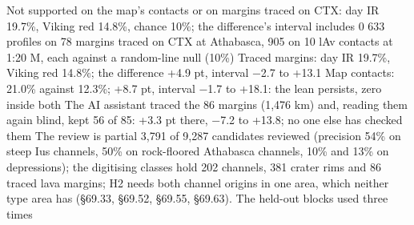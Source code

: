 Not supported on the map's contacts or on margins traced on CTX: day IR 19.7\%, Viking red 14.8\%, chance 10\%; the difference's interval includes 0
633 profiles on 78 margins traced on CTX at Athabasca, 905 on 10 lAv contacts at 1:20 M, each against a random-line null (10\%)
Traced margins: day IR 19.7\%, Viking red 14.8\%; the difference +4.9 pt, interval −2.7 to +13.1
Map contacts: 21.0\% against 12.3\%; +8.7 pt, interval −1.7 to +18.1: the lean persists, zero inside both
The AI assistant traced the 86 margins (1,476 km) and, reading them again blind, kept 56 of 85: +3.3 pt there, −7.2 to +13.8; no one else has checked them
The review is partial
3,791 of 9,287 candidates reviewed (precision 54\% on steep Ius channels, 50\% on rock-floored Athabasca channels, 10\% and 13\% on depressions); the digitising classes hold 202 channels, 381 crater rims and 86 traced lava margins; H2 needs both channel origins in one area, which neither type area has (§69.33, §69.52, §69.55, §69.63).
The held-out blocks used three times

